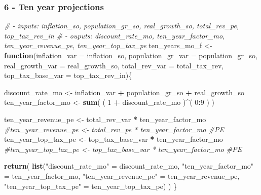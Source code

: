 \documentclass[]{article}
\newenvironment{Shaded}{\begin{snugshade}}{\end{snugshade}}
\newcommand{\CommentTok}[1]{\textcolor[rgb]{0.56,0.35,0.01}{\textit{#1}}}
\newcommand{\ControlFlowTok}[1]{\textcolor[rgb]{0.13,0.29,0.53}{\textbf{#1}}}
\newcommand{\DataTypeTok}[1]{\textcolor[rgb]{0.13,0.29,0.53}{#1}}
\newcommand{\DecValTok}[1]{\textcolor[rgb]{0.00,0.00,0.81}{#1}}
\newcommand{\KeywordTok}[1]{\textcolor[rgb]{0.13,0.29,0.53}{\textbf{#1}}}
\newcommand{\NormalTok}[1]{#1}
\newcommand{\OperatorTok}[1]{\textcolor[rgb]{0.81,0.36,0.00}{\textbf{#1}}}
\newcommand{\StringTok}[1]{\textcolor[rgb]{0.31,0.60,0.02}{#1}}
\begin{document}
\hypertarget{ten-year-projections}{%
\subsubsection{6 - Ten year projections}\label{ten-year-projections}}

\begin{Shaded}
\begin{Highlighting}[]
\CommentTok{# - inputs: inflation_so, population_gr_so, real_growth_so, total_rev_pe, top_tax_rev_in}
\CommentTok{# - ouputs: discount_rate_mo, ten_year_factor_mo, ten_year_revenue_pe, ten_year_top_tax_pe}
\NormalTok{ten_years_mo_f <-}\StringTok{ }\ControlFlowTok{function}\NormalTok{(}\DataTypeTok{inflation_var =}\NormalTok{ inflation_so, }\DataTypeTok{population_gr_var =}\NormalTok{ population_gr_so,}
                           \DataTypeTok{real_growth_var =}\NormalTok{ real_growth_so, }\DataTypeTok{total_rev_var =}\NormalTok{ total_tax_rev, }
                           \DataTypeTok{top_tax_base_var =}\NormalTok{ top_tax_rev_in)\{}
  
  
  
\NormalTok{    discount_rate_mo <-}\StringTok{ }\NormalTok{inflation_var }\OperatorTok{+}\StringTok{ }\NormalTok{population_gr_so }\OperatorTok{+}\StringTok{ }\NormalTok{real_growth_so  }
\NormalTok{    ten_year_factor_mo <-}\StringTok{ }\KeywordTok{sum}\NormalTok{( ( }\DecValTok{1} \OperatorTok{+}\StringTok{ }\NormalTok{discount_rate_mo )}\OperatorTok{^}\NormalTok{( }\DecValTok{0}\OperatorTok{:}\DecValTok{9}\NormalTok{ ) ) }

\NormalTok{    ten_year_revenue_pe <-}\StringTok{ }\NormalTok{total_rev_var }\OperatorTok{*}\StringTok{ }\NormalTok{ten_year_factor_mo     }
    \CommentTok{#ten_year_revenue_pe <- total_rev_pe * ten_year_factor_mo                      #PE}
\NormalTok{    ten_year_top_tax_pe <-}\StringTok{ }\NormalTok{top_tax_base_var }\OperatorTok{*}\StringTok{ }\NormalTok{ten_year_factor_mo          }
    \CommentTok{#ten_year_top_tax_pe <- top_tax_base_var * ten_year_factor_mo                  #PE}
    
    
    
    \KeywordTok{return}\NormalTok{( }\KeywordTok{list}\NormalTok{(}\StringTok{"discount_rate_mo"}\NormalTok{ =}\StringTok{ }\NormalTok{discount_rate_mo, }\StringTok{"ten_year_factor_mo"}\NormalTok{ =}\StringTok{ }\NormalTok{ten_year_factor_mo, }
           \StringTok{"ten_year_revenue_pe"}\NormalTok{ =}\StringTok{ }\NormalTok{ten_year_revenue_pe, }\StringTok{"ten_year_top_tax_pe"}\NormalTok{ =}\StringTok{ }\NormalTok{ten_year_top_tax_pe) )}
\NormalTok{\}}


\end{Highlighting}
\end{Shaded}
\end{document}
